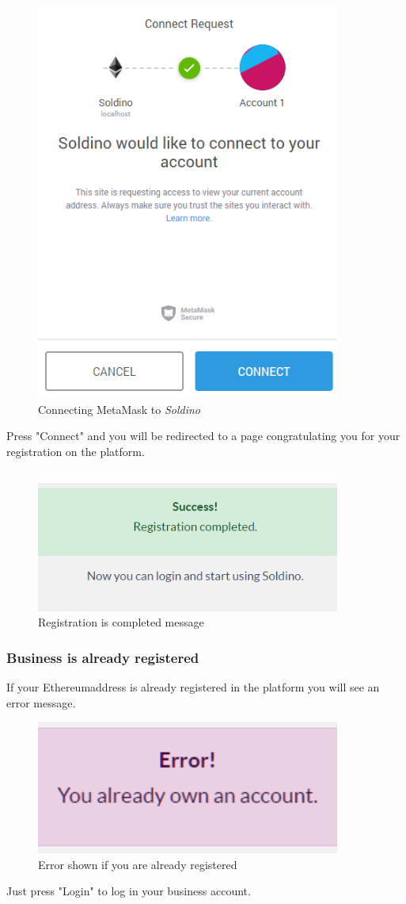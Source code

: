 	\begin{figure}[H]
		\includegraphics[width=10cm]{res/images/metamask_connect.png}
		\centering
		\caption{Connecting MetaMask to \textit{Soldino}}
	\end{figure}
	\noindent \noindent Press "Connect" and you will be redirected to a page 
	congratulating you for your registration on the platform.
	\begin{figure}[H]
		\includegraphics[width=10cm]{res/images/registration_complete.png}
		\centering
		\caption{Registration is completed message}
	\end{figure}
		\subsubsection{Business is already registered}
		If your Ethereum\glosp address is already registered in the platform you will 
		see an error message.
		\begin{figure}[H]
			\includegraphics[width=10cm]{res/images/user_already_registered.png}
			\centering
			\caption{Error shown if you are already registered}
		\end{figure}
		\noindent Just press "Login" to log in your business account.
